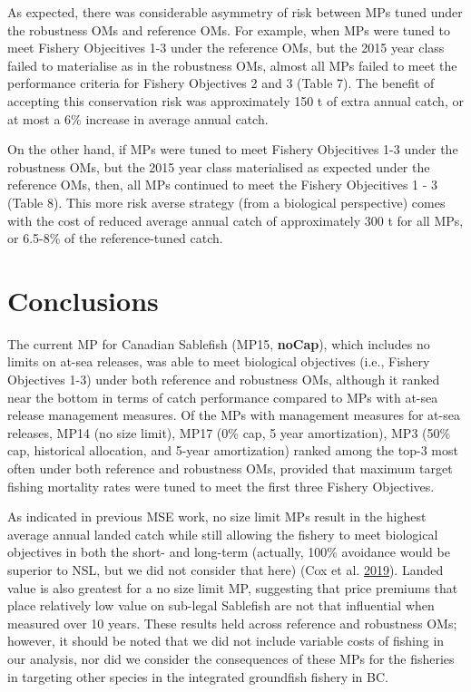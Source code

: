 \documentclass[11pt]{book}
\begin{document}
As expected, there was considerable asymmetry of risk between MPs tuned under the robustness OMs and reference OMs. For example, when MPs were tuned to meet Fishery Objecitives 1-3 under the reference OMs, but the 2015 year class failed to materialise as in the robustness OMs, almost all MPs failed to meet the performance criteria for Fishery Objectives 2 and 3 (Table 7). The benefit of accepting this conservation risk was approximately 150 t of extra annual catch, or at most a 6\% increase in average annual catch.

On the other hand, if MPs were tuned to meet Fishery Objecitives 1-3 under the robustness OMs, but the 2015 year class materialised as expected under the reference OMs, then, all MPs continued to meet the Fishery Objecitives 1 - 3 (Table 8). This more risk averse strategy (from a biological perspective) comes with the cost of reduced average annual catch of approximately 300 t for all MPs, or 6.5-8\% of the reference-tuned catch.

\hypertarget{conclusions}{%
\section{Conclusions}\label{conclusions}}

The current MP for Canadian Sablefish (MP15, \textbf{noCap}), which includes no limits on at-sea releases, was able to meet biological objectives (i.e., Fishery Objectives 1-3) under both reference and robustness OMs, although it ranked near the bottom in terms of catch performance compared to MPs with at-sea release management measures. Of the MPs with management measures for at-sea releases, MP14 (no size limit), MP17 (0\% cap, 5 year amortization), MP3 (50\% cap, historical allocation, and 5-year amortization) ranked among the top-3 most often under both reference and robustness OMs, provided that maximum target fishing mortality rates were tuned to meet the first three Fishery Objectives.

As indicated in previous MSE work, no size limit MPs result in the highest average annual landed catch while still allowing the fishery to meet biological objectives in both the short- and long-term (actually, 100\% avoidance would be superior to NSL, but we did not consider that here) (Cox et al. \protect\hyperlink{ref-cox2019evaluating}{2019}). Landed value is also greatest for a no size limit MP, suggesting that price premiums that place relatively low value on sub-legal Sablefish are not that influential when measured over 10 years. These results held across reference and robustness OMs; however, it should be noted that we did not include variable costs of fishing in our analysis, nor did we consider the consequences of these MPs for the fisheries in targeting other species in the integrated groundfish fishery in BC.
\end{document}
